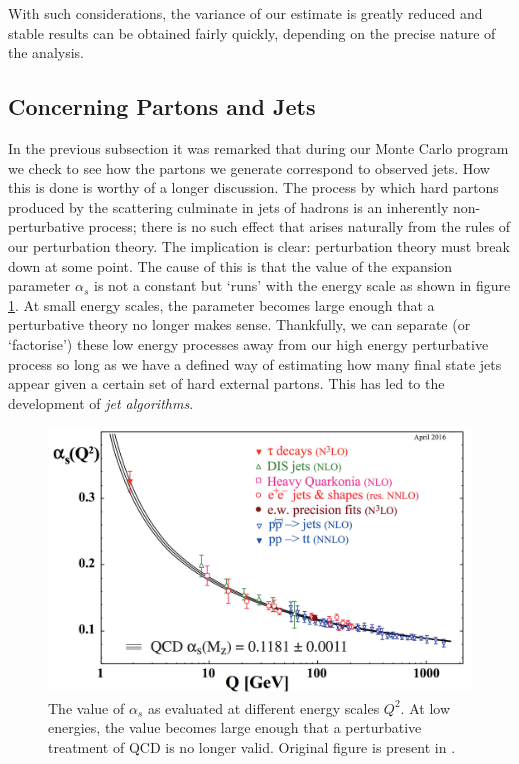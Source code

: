 With such considerations, the variance of our estimate is greatly reduced and stable results can be obtained fairly quickly, depending on the precise nature of the analysis. 

\subsection{Concerning Partons and Jets}
In the previous subsection it was remarked that during our Monte Carlo program we check to see how the partons we generate correspond to observed jets. How this is done is worthy of a longer discussion. The process by which hard partons produced by the scattering culminate in jets of hadrons is an inherently non-perturbative process; there is no such effect that arises naturally from the rules of our perturbation theory. The implication is clear: perturbation theory must break down at some point. The cause of this is that the value of the expansion parameter $\alpha_s$ is not a constant but `runs' with the energy scale as shown in figure \ref{fig:alphas}. At small energy scales, the parameter becomes large enough that a perturbative theory no longer makes sense. Thankfully, we can separate (or `factorise') these low energy processes away from our high energy perturbative process so long as we have a defined way of estimating how many final state jets appear given a certain set of hard external partons. This has led to the development of \emph{jet algorithms}. 

\begin{figure}[t]
\centering
\includegraphics[scale=0.3]{Images/running_alphas.png} 
\caption{The value of $\alpha_s$ as evaluated at different energy scales $Q^2$. At low energies, the value becomes large enough that a perturbative treatment of QCD is no longer valid. Original figure is present in \cite{Hagiwara2002}.}
\label{fig:alphas}
\end{figure}

